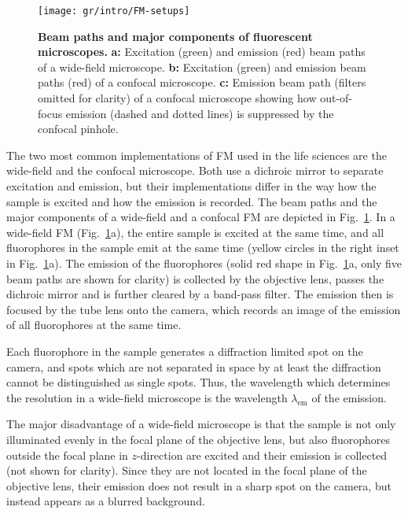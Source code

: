 \begin{figure}
  \texttt{[image: gr/intro/FM-setups]}
  \caption{\textbf{Beam paths and major components of fluorescent
      microscopes.} \textbf{a:} Excitation (green) and emission (red) beam
    paths of a wide-field microscope. \textbf{b:} Excitation (green) and
    emission beam paths (red) of a confocal microscope.  \textbf{c:} Emission
    beam path (filters omitted for clarity) of a confocal microscope showing
    how out-of-focus emission (dashed and dotted lines) is suppressed by the
    confocal pinhole.}
  \label{fig:FM-setups}
\end{figure}

The two most common implementations of FM used in the life sciences are the
wide-field and the confocal microscope. Both use a dichroic mirror to separate
excitation and emission, but their implementations differ in the way how the
sample is excited and how the emission is recorded. The beam paths and the
major components of a wide-field and a confocal FM are depicted in
Fig.~\ref{fig:FM-setups}. In a wide-field FM (Fig.~\ref{fig:FM-setups}a), the
entire sample is excited at 
the same time, and all fluorophores in the sample emit at the same time
(yellow circles in the right inset in Fig.~\ref{fig:FM-setups}a). The emission
of the fluorophores (solid red shape in Fig.~\ref{fig:FM-setups}a, only five
beam paths are shown for clarity) is collected by the objective lens, passes
the dichroic mirror and is further cleared by a band-pass filter. The emission
then is focused by the tube lens onto the camera, which records an image of
the emission of all fluorophores at the same time.

Each fluorophore in the sample generates a diffraction limited spot on the
camera, and spots which are not separated in space by at least the diffraction
cannot be distinguished as single spots. Thus, the wavelength which determines
the resolution in a wide-field microscope is the wavelength $\lambda_\text{em}$
of the emission.

The major disadvantage of a wide-field microscope is that the sample is not
only illuminated evenly in the focal plane of the objective lens, but also
fluorophores outside the focal plane in $z$-direction are excited and their
emission is collected (not shown for clarity). Since they are not located in
the focal plane of the objective lens, their emission does not result in a
sharp spot on the camera, but instead appears as a blurred background.    

